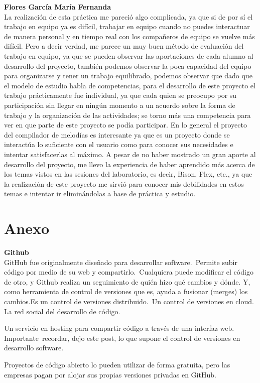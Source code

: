 \documentclass[12pt]{article}
\begin{document}
{\bf Flores García María Fernanda}\\
La realización de esta práctica me pareció algo complicada, ya que si de por sí el trabajo en equipo ya es difícil, trabajar en equipo cuando no puedes interactuar de manera personal y en tiempo real con los compañeros de equipo se vuelve más difícil. Pero a decir verdad, me parece un muy buen método de evaluación del trabajo en equipo, ya que se pueden observar  las aportaciones de cada alumno al desarrollo del proyecto, también podemos observar la poca capacidad del equipo para organizarse y tener un trabajo equilibrado, podemos observar que dado que el modelo de estudio habla de competencias, para el desarrollo de este proyecto el trabajo prácticamente fue individual, ya que cada quien se preocupo por su participación sin llegar en ningún momento a un acuerdo sobre la forma de trabajo y la organización de las actividades; se torno más una competencia para ver en que parte de este proyecto se podía participar.
En lo general el proyecto del compilador de melodías es interesante ya que es un proyecto donde se interactúa lo suficiente con el usuario como para conocer sus necesidades e intentar satisfacerlas al máximo. A pesar de no haber mostrado un gran aporte al desarrollo del proyecto, me llevo la experiencia de haber aprendido más  acerca de los temas vistos en las sesiones del laboratorio, es decir, Bison, Flex, etc., ya que la realización de este proyecto me sirvió para conocer mis debilidades en estos temas e intentar ir eliminándolas a base de práctica y estudio.\\


\section{Anexo}
{\bf Github}\\
GitHub fue originalmente diseñado para desarrollar software. Permite subir código por medio de su web y compartirlo. Cualquiera puede modificar el código de otro, y Github realiza un seguimiento de quién hizo qué cambios y dónde. Y, como herramienta de control de versiones que es, ayuda a fusionar (merges) los cambios.Es un control de versiones distribuido. Un control de versiones en cloud. La red social del desarrollo de código.

Un servicio en hosting para compartir código a través de una interfaz web. Importante recordar, dejo este post, lo que supone el control de versiones en desarrollo software.

Proyectos de código abierto lo pueden utilizar de forma gratuita, pero las empresas pagan por alojar sus propias versiones privadas en GitHub.
\end{document}
